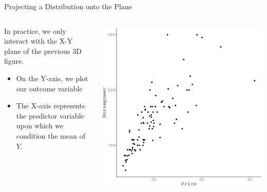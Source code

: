 \documentclass[10pt]{beamer}\usepackage[]{graphicx}\usepackage[]{color}
\makeatletter
\def\maxwidth{ %
  \ifdim\Gin@nat@width>\linewidth
    \linewidth
  \else
    \Gin@nat@width
  \fi
}
\newenvironment{knitrout}{}{} %
\makeatother
\begin{document}

\begin{frame}{Projecting a Distribution onto the Plane}

  \begin{columns}
    \begin{column}{0.5\textwidth}
      In practice, we only interact with the X-Y plane of the previous 3D
      figure.
      \vb
      \begin{itemize}
      \item On the Y-axis, we plot our outcome variable
        \vb
      \item The X-axis represents the predictor variable upon which we condition
        the mean of $Y$.
      \end{itemize}
    \end{column}

    \begin{column}{0.5\textwidth}

\begin{knitrout}\footnotesize
{}\color{fgcolor}

{\centering \includegraphics[width=\maxwidth]{figure/unnamed-chunk-3-1} 

}


\end{knitrout}

\end{column}
\end{columns}

\end{frame}
\end{document}
